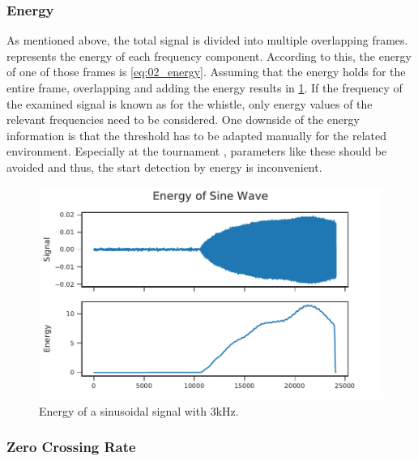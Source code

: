 \subsubsection*{Energy}

As mentioned above, the total signal is divided into multiple overlapping frames.
 represents the energy of each frequency
component.
According to this, the energy of one of those frames is \cref{eq:02_energy}.
Assuming that the energy holds for the entire frame, overlapping and adding the energy
results in \cref{fig:03_energy}.
If the frequency of the examined signal is known as for the whistle, only energy values
of the relevant frequencies need to be considered.
One downside of the energy information is that the threshold has to be adapted
manually for the related environment.
Especially at the tournament , parameters like these should be avoided and thus,
the start detection by energy is inconvenient.
\begin{figure}[ht]
	\centering
		\includegraphics[]{figures/sine_energy}
	\caption{Energy of a sinusoidal signal with 3\si{\kilo\hertz}.}
	\label{fig:03_energy}
\end{figure}

\subsubsection*{Zero Crossing Rate}

